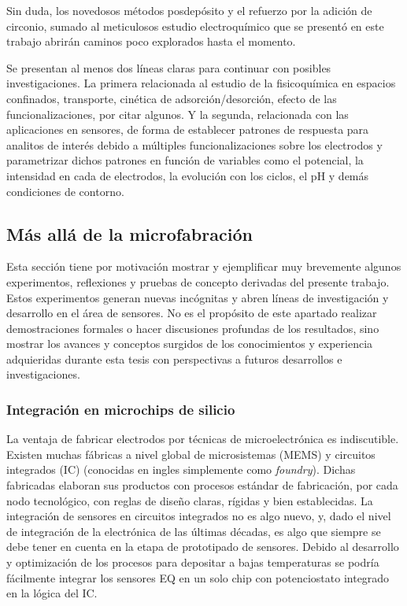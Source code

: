 Sin duda, los novedosos métodos posdepósito y el refuerzo por la adición de circonio, sumado al meticulosos estudio electroquímico que se presentó en este trabajo abrirán caminos poco explorados hasta el momento.

Se presentan al menos dos líneas claras para continuar con posibles investigaciones. La primera relacionada al estudio de la fisicoquímica en espacios confinados, transporte, cinética de adsorción/desorción, efecto de las funcionalizaciones, por citar algunos. Y la segunda, relacionada con las aplicaciones en sensores, de forma de establecer patrones de respuesta para analitos de interés debido a múltiples funcionalizaciones sobre los electrodos y parametrizar dichos patrones en función de variables como el potencial, la intensidad en cada de electrodos, la evolución con los ciclos, el pH y demás condiciones de contorno.

\subsection{Más allá de la microfabración}
	
	  Esta sección tiene por motivación mostrar y ejemplificar muy brevemente algunos experimentos, reflexiones y pruebas de concepto derivadas del presente trabajo. Estos experimentos generan nuevas incógnitas y abren líneas de investigación y desarrollo en el área de sensores. No es el propósito de este apartado realizar demostraciones formales o hacer discusiones profundas de los resultados, sino mostrar los avances y conceptos surgidos de los conocimientos y experiencia adquieridas durante esta tesis con perspectivas a futuros desarrollos e investigaciones.

	\subsubsection{Integración en microchips de silicio}

	  La ventaja de fabricar electrodos por técnicas de microelectrónica es indiscutible. Existen muchas fábricas a nivel global de microsistemas (MEMS) y circuitos integrados (IC) (conocidas en ingles simplemente como \textit{foundry}). Dichas fabricadas elaboran sus productos con procesos estándar de fabricación, por cada nodo tecnológico, con reglas de diseño claras, rígidas y bien establecidas. La integración de sensores en circuitos integrados no es algo nuevo, y, dado el nivel de integración de la electrónica de las últimas décadas, es algo que siempre se debe tener en cuenta en la etapa de prototipado de sensores.\cite{Wang2012,Liu1993,Novell2012,Yu2013,Sarkar2014} Debido al desarrollo y optimización de los procesos para depositar \pdm\space a bajas temperaturas se podría fácilmente integrar los sensores EQ en un solo chip con potenciostato integrado en la lógica del IC.
 	
